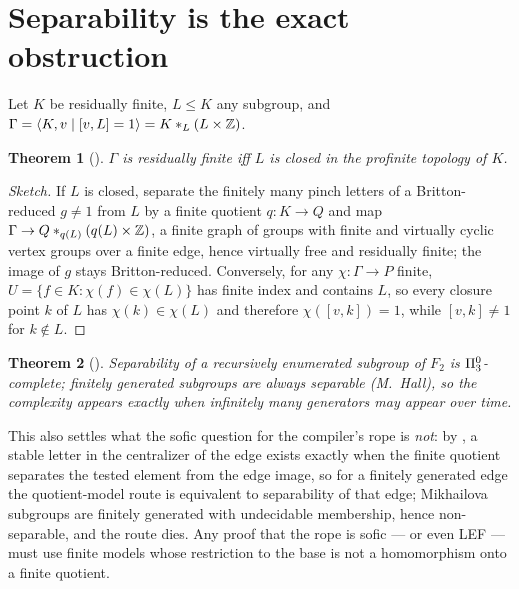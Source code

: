 \documentclass[11pt]{article}
\newtheorem{theorem}{Theorem}[section]
\theoremstyle{definition}
\begin{document}
\section{Separability is the exact obstruction}
Let $K$ be residually finite, $L\le K$ any subgroup, and $\Gamma=\langle K,v\mid [v,L]=1\rangle=K*_L(L\times\mathbb Z)$.
\begin{theorem}[]
$\Gamma$ is residually finite iff $L$ is closed in the profinite topology of $K$.
\end{theorem}
\begin{proof}[Sketch]
If $L$ is closed, separate the finitely many pinch letters of a Britton-reduced $g\ne1$ from $L$ by a finite quotient $q:K\to Q$ and map $\Gamma\to Q*_{q(L)}(q(L)\times\mathbb Z)$, a finite graph of groups with finite and virtually cyclic vertex groups over a finite edge, hence virtually free and residually finite; the image of $g$ stays Britton-reduced. Conversely, for any $\chi:\Gamma\to P$ finite, $U=\{f\in K:\chi(f)\in\chi(L)\}$ has finite index and contains $L$, so every closure point $k$ of $L$ has $\chi(k)\in\chi(L)$ and therefore $\chi([v,k])=1$, while $[v,k]\ne 1$ for $k\notin L$.
\end{proof}
\begin{theorem}[]
Separability of a recursively enumerated subgroup of $F_2$ is $\Pi^0_3$-complete; finitely generated subgroups are always separable (M.\ Hall), so the complexity appears exactly when infinitely many generators may appear over time.
\end{theorem}
This also settles what the sofic question for the compiler's rope is \emph{not}: by , a stable letter in the centralizer of the edge exists exactly when the finite quotient separates the tested element from the edge image, so for a finitely generated edge the quotient-model route is equivalent to separability of that edge; Mikhailova subgroups are finitely generated with undecidable membership, hence non-separable, and the route dies. Any proof that the rope is sofic --- or even LEF --- must use finite models whose restriction to the base is not a homomorphism onto a finite quotient.
\end{document}
